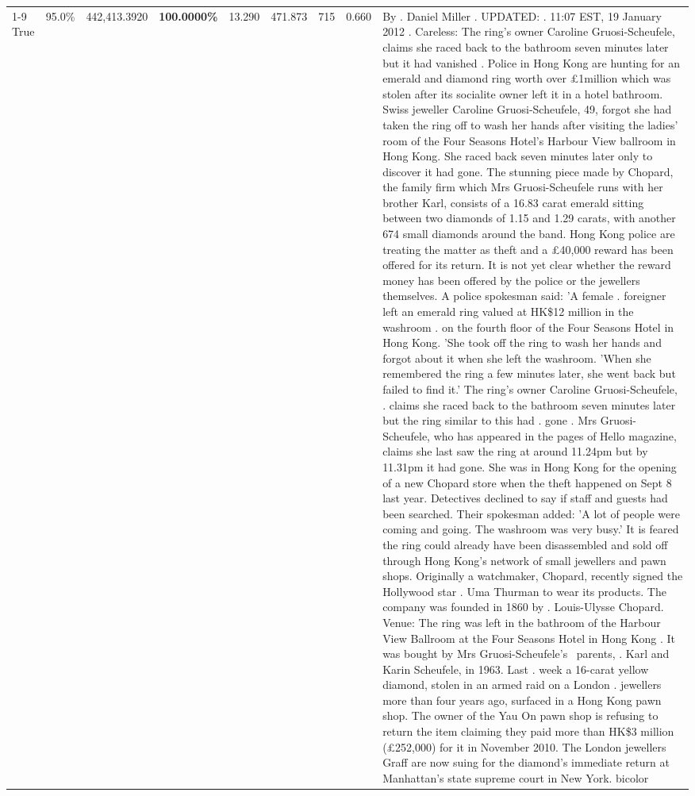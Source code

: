 \begin{table}[H]
\begin{tabular}{lllrlllll}
\cline{1-9}
True & 95.0\% & 442,413.3920 & \bfseries \color{red} 100.0000\% & 13.290 & 471.873 & 715 & 0.660 & By . Daniel Miller . UPDATED: . 11:07 EST, 19 January 2012 . Careless: The ring's owner Caroline Gruosi-Scheufele, claims she raced back to the bathroom seven minutes later but it had vanished . Police in Hong Kong are hunting for an emerald and diamond ring worth over £1million which was stolen after its socialite owner left it in a hotel bathroom. Swiss jeweller Caroline Gruosi-Scheufele, 49, forgot she had taken the ring off to wash her hands after visiting the ladies' room of the Four Seasons Hotel's Harbour View ballroom in Hong Kong. She raced back seven minutes later only to discover it had gone. The stunning piece made by Chopard, the family firm which Mrs Gruosi-Scheufele runs with her brother Karl, consists of a 16.83 carat emerald sitting between two diamonds of 1.15 and 1.29 carats, with another 674 small diamonds around the band. Hong Kong police are treating the matter as theft and a £40,000 reward has been offered for its return. It is not yet clear whether the reward money has been offered by the police or the jewellers themselves. A police spokesman said: 'A female . foreigner left an emerald ring valued at HK\$12 million in the washroom . on the fourth floor of the Four Seasons Hotel in Hong Kong. 'She took off the ring to wash her hands and forgot about it when she left the washroom. 'When she remembered the ring a few minutes later, she went back but failed to find it.' The ring's owner Caroline Gruosi-Scheufele, . claims she raced back to the bathroom seven minutes later but the ring similar to this had . gone . Mrs Gruosi-Scheufele, who has appeared in the pages of Hello magazine, claims she last saw the ring at around 11.24pm but by 11.31pm it had gone. She was in Hong Kong for the opening of a new Chopard store when the theft happened on Sept 8 last year. Detectives declined to say if staff and guests had been searched. Their spokesman added: 'A lot of people were coming and going. The washroom was very busy.' It is feared the ring could already have been disassembled and sold off through Hong Kong's network of small jewellers and pawn shops. Originally a watchmaker, Chopard, recently signed the Hollywood star . Uma Thurman to wear its products. The company was founded in 1860 by . Louis-Ulysse Chopard. Venue: The ring was left in the bathroom of the Harbour View Ballroom at the Four Seasons Hotel in Hong Kong . It was bought by Mrs Gruosi-Scheufele's  parents, . Karl and Karin Scheufele, in 1963. Last . week a 16-carat yellow diamond, stolen in an armed raid on a London . jewellers more than four years ago, surfaced in a Hong Kong pawn shop. The owner of the Yau On pawn shop is refusing to return the item claiming they paid more than HK\$3 million (£252,000) for it in November 2010. The London jewellers Graff are now suing for the diamond’s immediate return at Manhattan’s state supreme court in New York. bicolor \\

\end{tabular}
\end{table}
